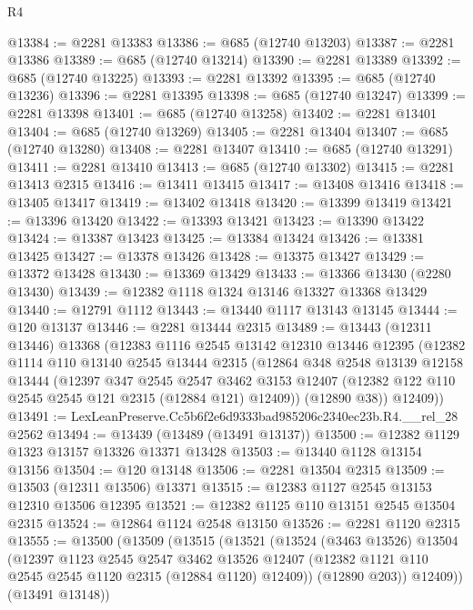 \begin{lexlean}{R4}
\begin{coremodule}
@13384 := @2281 @13383
@13386 := @685 (@12740 @13203)
@13387 := @2281 @13386
@13389 := @685 (@12740 @13214)
@13390 := @2281 @13389
@13392 := @685 (@12740 @13225)
@13393 := @2281 @13392
@13395 := @685 (@12740 @13236)
@13396 := @2281 @13395
@13398 := @685 (@12740 @13247)
@13399 := @2281 @13398
@13401 := @685 (@12740 @13258)
@13402 := @2281 @13401
@13404 := @685 (@12740 @13269)
@13405 := @2281 @13404
@13407 := @685 (@12740 @13280)
@13408 := @2281 @13407
@13410 := @685 (@12740 @13291)
@13411 := @2281 @13410
@13413 := @685 (@12740 @13302)
@13415 := @2281 @13413 @2315
@13416 := @13411 @13415
@13417 := @13408 @13416
@13418 := @13405 @13417
@13419 := @13402 @13418
@13420 := @13399 @13419
@13421 := @13396 @13420
@13422 := @13393 @13421
@13423 := @13390 @13422
@13424 := @13387 @13423
@13425 := @13384 @13424
@13426 := @13381 @13425
@13427 := @13378 @13426
@13428 := @13375 @13427
@13429 := @13372 @13428
@13430 := @13369 @13429
@13433 := @13366 @13430 (@2280 @13430)
@13439 := @12382 @1118 @1324 @13146 @13327 @13368 @13429
@13440 := @12791 @1112
@13443 := @13440 @1117 @13143 @13145
@13444 := @120 @13137
@13446 := @2281 @13444 @2315
@13489 := @13443
    (@12311 @13446)
    @13368
    (@12383
      @1116
      @2545
      @13142
      @12310
      @13446
      @12395
      (@12382
        @1114
        @110
        @13140
        @2545
        @13444
        @2315
        (@12864
          @348
          @2548
          @13139
          @12158
          @13444
          (@12397
            @347
            @2545
            @2547
            @3462
            @3153
            @12407
            (@12382 @122 @110 @2545 @2545 @121 @2315 (@12884 @121) @12409))
          (@12890 @38))
        @12409))
@13491 := LexLeanPreserve.Cc5b6f2e6d9333bad985206c2340ec23b.R4.__rel_28 @2562
@13494 := @13439 (@13489 (@13491 @13137))
@13500 := @12382 @1129 @1323 @13157 @13326 @13371 @13428
@13503 := @13440 @1128 @13154 @13156
@13504 := @120 @13148
@13506 := @2281 @13504 @2315
@13509 := @13503 (@12311 @13506) @13371
@13515 := @12383 @1127 @2545 @13153 @12310 @13506 @12395
@13521 := @12382 @1125 @110 @13151 @2545 @13504 @2315
@13524 := @12864 @1124 @2548 @13150
@13526 := @2281 @1120 @2315
@13555 := @13500
    (@13509
      (@13515
        (@13521
          (@13524
            (@3463 @13526)
            @13504
            (@12397
              @1123
              @2545
              @2547
              @3462
              @13526
              @12407
              (@12382 @1121 @110 @2545 @2545 @1120 @2315 (@12884 @1120) @12409))
            (@12890 @203))
          @12409))
      (@13491 @13148))

\end{coremodule}
\end{lexlean}
